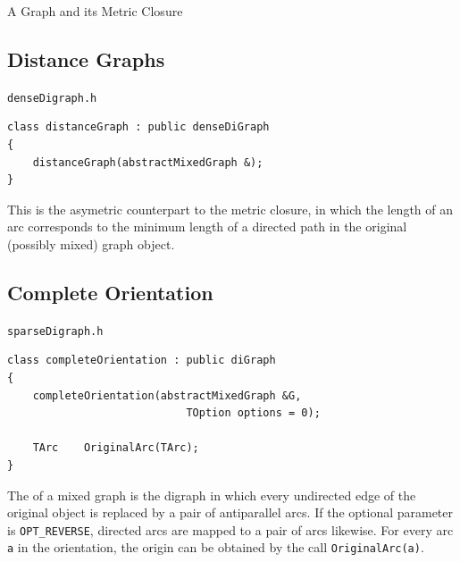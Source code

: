 \documentclass[a4paper,11pt,twoside]{book}
\begin{document}
\begin{multicols}{2}
\bigskip
\begin{figurehere}
\begin{center}
\epsfxsize=4cm
\epsfxsize=4cm
\hspace*{1cm}
\vspace{0.5cm}
\caption{\label{flb_closure}A Graph and its Metric Closure}
\end{center}
\end{figurehere}


\subsection{Distance Graphs}
\label{sbl_distance_graph}
\myinclude\verb/denseDigraph.h/
\begin{mymethods}
\begin{verbatim}
class distanceGraph : public denseDiGraph
{
    distanceGraph(abstractMixedGraph &);
}
\end{verbatim}
\end{mymethods}
This is the asymetric counterpart to the metric closure, in which the length of
an arc corresponds to the minimum length of a directed path in the original
(possibly mixed) graph object.


\subsection{Complete Orientation}
\label{sbl_complete_orientation}
\myinclude\verb/sparseDigraph.h/
\begin{mymethods}
\begin{verbatim}
class completeOrientation : public diGraph
{
    completeOrientation(abstractMixedGraph &G,
                            TOption options = 0);

    TArc    OriginalArc(TArc);
}
\end{verbatim}
\end{mymethods}
The  of a mixed graph is the digraph in which every
undirected edge of the original object is replaced by a pair of antiparallel
arcs. If the optional parameter is \verb/OPT_REVERSE/, directed arcs are
mapped to a pair of arcs likewise. For every arc \verb/a/ in the orientation,
the origin can be obtained by the call \verb/OriginalArc(a)/.



\end{multicols}
\end{document}

